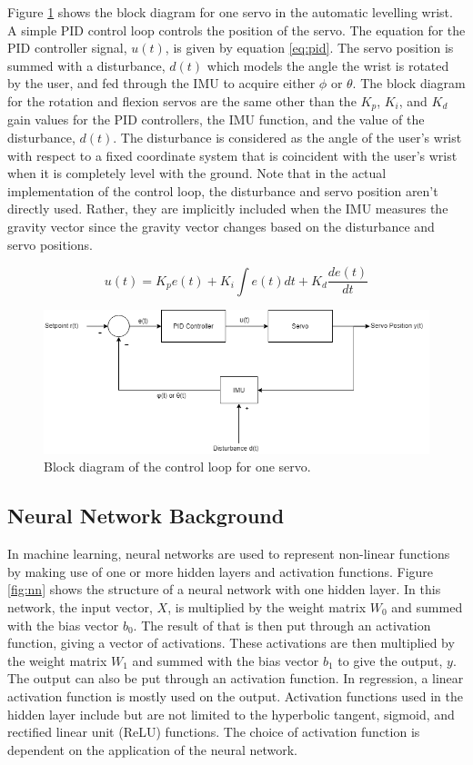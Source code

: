 \documentclass[letterpaper,12pt]{article}
\begin{document}
Figure \ref{fig:servo_system} shows the block diagram for one servo in the automatic levelling wrist. A simple PID control loop controls the position of the servo. The equation for the PID controller signal, $u(t)$, is given by equation \ref{eq:pid}. The servo position is summed with a disturbance, $d(t)$ which models the angle the wrist is rotated by the user, and fed through the IMU to acquire either $\phi$ or $\theta$. The block diagram for the rotation and flexion servos are the same other than the $K_p$, $K_i$, and $K_d$ gain values for the PID controllers, the IMU function, and the value of the disturbance, $d(t)$. The disturbance is considered as the angle of the user's wrist with respect to a fixed coordinate system that is coincident with the user's wrist when it is completely level with the ground. Note that in the actual implementation of the control loop, the disturbance and servo position aren't directly used. Rather, they are implicitly included when the IMU measures the gravity vector since the gravity vector changes based on the disturbance and servo positions.

\begin{equation}
	\label{eq:pid}
	u(t) = K_p e(t) + K_i \int e(t) dt + K_d \frac{de(t)}{dt}
\end{equation}

\begin{figure}[H]
\centering \includegraphics[width=0.8\columnwidth]{servo_system.png}
\caption{\label{fig:servo_system}Block diagram of the control loop for one servo.}
\end{figure}

\subsection{Neural Network Background}
In machine learning, neural networks are used to represent non-linear functions by making use of one or more hidden layers and activation functions. Figure \ref{fig:nn} shows the structure of a neural network with one hidden layer. In this network, the input vector, $X$, is multiplied by the weight matrix $W_{0}$ and summed with the bias vector $b_{0}$. The result of that is then put through an activation function, giving a vector of activations. These activations are then multiplied by the weight matrix $W_{1}$ and summed with the bias vector $b_{1}$ to give the output, $y$. The output can also be put through an activation function. In regression, a linear activation function is mostly used on the output. Activation functions used in the hidden layer include but are not limited to the hyperbolic tangent, sigmoid, and rectified linear unit (ReLU) functions. The choice of activation function is dependent on the application of the neural network.
\end{document}
